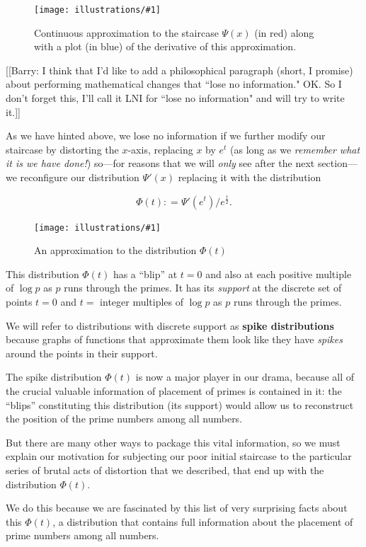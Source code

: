 \documentclass[11pt]{article}
\newcommand{\ill}[3]{ 
   \begin{figure}[H]
   \begin{center}
   \texttt{[image: illustrations/\#1]}
   \caption{#3}
   \end{center}
    \end{figure}
}
\theoremstyle{plain}
\theoremstyle{definition}
\numberwithin{equation}{section}
\numberwithin{figure}{section}
\numberwithin{table}{section}
\begin{document}
     \ill{psi_prime}{.7}{Continuous approximation to the staircase
       $\Psi(x)$ (in red) along with a plot (in blue) of the
       derivative of this approximation.}
      
\bigskip

[[Barry: I think that I'd like to add a philosophical paragraph
(short, I promise) about performing mathematical changes that ``lose
no information."  OK. So I don't forget this, I'll call it LNI for
``lose no information" and will try to write it.]]
  
As we have hinted above, we lose no information if we further modify
our staircase by distorting the $x$-axis, replacing $x$ by $e^t$ (as
long as we {\em remember what it is we have done!})  so---for reasons
that we will {\em only} see after the next section---we reconfigure
our distribution $\Psi'(x)$ replacing it with the distribution

$$
  \Phi(t) : = \Psi'(e^t)/e^{\frac{t}{2}}.
$$

  
\bigskip
   
   
\ill{phi_50}{0.6}{An approximation to the distribution $\Phi(t)$}
     
\bigskip


This distribution $\Phi(t)$ has a ``blip'' at $t=0$ and also at each
positive multiple of $\log p$ as $p$ runs through the primes.  It has
its {\em support} at the discrete set of points $t=0$ and $t=$
integer multiples of $\log p$ as $p$ runs through the primes.


We will refer to distributions with discrete support as {\bf spike
  distributions} because graphs of functions that approximate them
look like they have {\em spikes} around the points in their support.

The spike distribution $\Phi(t)$ is now a major player in our drama,
because all of the crucial valuable information of placement of primes
is contained in it: the ``blips'' constituting this distribution (its
support) would allow us to reconstruct the position of the prime
numbers among all numbers.

But there are many other ways to package this vital information, so we
must explain our motivation for subjecting our poor initial staircase
to the particular series of brutal acts of distortion that we
described, that end up with the distribution $\Phi(t)$.

We do this because we are fascinated by this list of very surprising
facts about this $\Phi(t)$, a distribution that contains full
information about the placement of prime numbers among all numbers.
\end{document}
